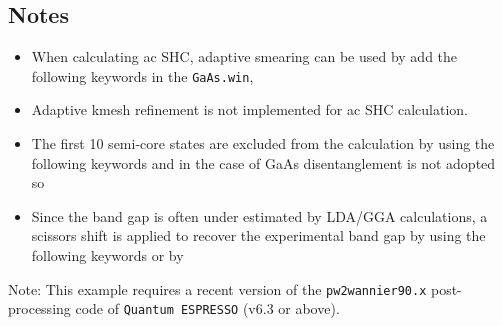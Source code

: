 \documentclass[a4paper,11pt,twoside]{article}
\begin{document}
\subsection*{Notes}
%
\begin{itemize}
	\item When calculating ac SHC, adaptive smearing can be used 
	by add the following keywords in the {\tt GaAs.win}, 

	\item Adaptive kmesh refinement is not implemented for ac SHC calculation.

	\item The first 10 semi-core states are excluded from the calculation by using the following keywords
    and in the case of GaAs disentanglement is not adopted so
	\item Since the band gap is often under estimated by LDA/GGA calculations, a scissors shift is applied to recover 
	the experimental band gap by using the 
	following keywords
or by
\end{itemize}



Note: This example requires a recent version of the {\tt pw2wannier90.x} post-processing code of {\tt Quantum ESPRESSO} (v6.3 or above).
\end{document}
